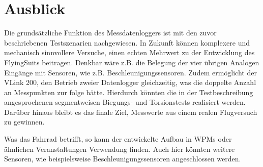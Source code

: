 \section{Ausblick}
Die grundsätzliche Funktion des Messdatenloggers ist mit den zuvor beschriebenen Testszenarien nachgewiesen.
In Zukunft können komplexere und mechanisch sinnvollere Versuche, einen echten Mehrwert zu der Entwicklung des FlyingSuits beitragen.
Denkbar wäre z.B. die Belegung der vier übrigen Analogen Eingänge mit Sensoren, wie z.B. Beschleunigungssensoren.
Zudem ermöglicht der VLink 200, den Betrieb zweier Datenlogger gleichzeitig, was die doppelte Anzahl an Messpunkten zur folge hätte.
Hierdurch könnten die in der Testbeschreibung angesprochenen segmentweisen Biegungs- und Torsionstests realisiert werden.
Darüber hinaus bleibt es das finale Ziel, Messwerte aus einem realen Flugversuch zu gewinnen.

Was das Fahrrad betrifft, so kann der entwickelte Aufbau in WPMs oder ähnlichen Veranstaltungen Verwendung finden.
Auch hier könnten weitere Sensoren, wie beispielsweise Beschleunigungssensoren angeschlossen werden.